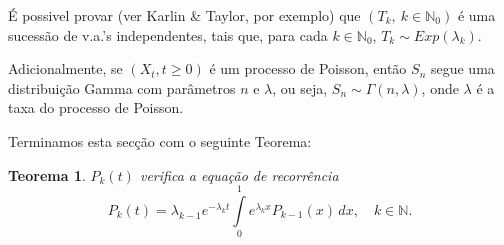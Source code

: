 \documentclass[
  11pt,
  a4paper,
]{book}
\newtheorem{theorem}{Teorema}[chapter]
\theoremstyle{definition}
\theoremstyle{definition}
\theoremstyle{definition}
\theoremstyle{definition}
\theoremstyle{remark}
\begin{document}
É possivel provar (ver Karlin \& Taylor, por exemplo) que \((T_k, ~ k \in \mathbb{N}_0)\) é uma sucessão de v.a.'s independentes, tais que, para cada \(k \in \mathbb{N}_0\), \(T_k \sim Exp(\lambda_k)\).

Adicionalmente, se \((X_t, t \geq 0)\) é um processo de Poisson, então \(S_n\) segue uma distribuição Gamma com parâmetros \(n\) e \(\lambda\), ou seja, \(S_n \sim \Gamma(n,\lambda)\), onde \(\lambda\) é a taxa do processo de Poisson.

Terminamos esta secção com o seguinte Teorema:

\begin{theorem}
\(P_k(t)\) verifica a equação de recorrência
\[P_k(t)=\lambda_{k-1} e^{-\lambda_k t}\int\limits_{0}^{1}e^{\lambda_k x}P_{k-1}(x) \, dx, \quad k \in \mathbb{N}.\]
\end{theorem}

\(\,\)
\end{document}
